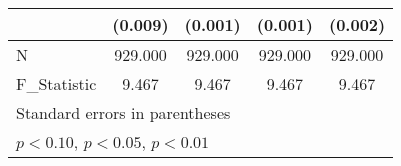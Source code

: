 {\begin{tabular}{l*{4}{c}}
            &     (0.009)         &     (0.001)         &     (0.001)         &     (0.002)         \\
\hline
N           &     929.000         &     929.000         &     929.000         &     929.000         \\
F\_Statistic &       9.467         &       9.467         &       9.467         &       9.467         \\
\hline\hline
\multicolumn{5}{l}{\footnotesize Standard errors in parentheses}\\
\multicolumn{5}{l}{\footnotesize \sym{*} \(p<0.10\), \sym{**} \(p<0.05\), \sym{***} \(p<0.01\)}\\
\end{tabular}
}
